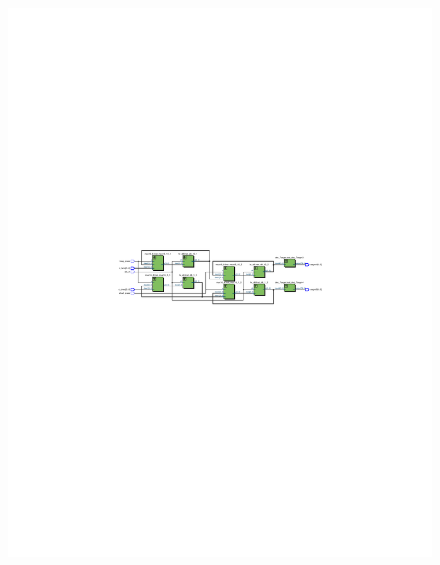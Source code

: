 \documentclass[FM,ZP]{tulthesis}
\begin{document}
	\begin{figure}[h]
		\centering
		\includegraphics[clip,width=1\textwidth]{display_memory.pdf}
	\end{figure}
\end{document}
